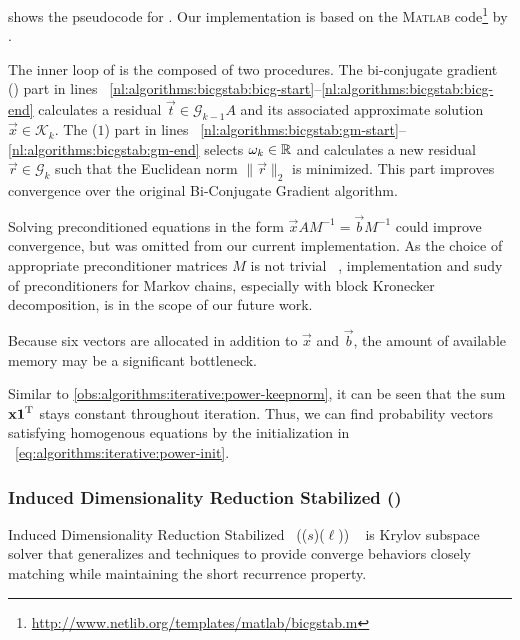  shows the pseudocode for
. Our implementation is based on the \textsc{Matlab}
code\footnote{\url{http://www.netlib.org/templates/matlab/bicgstab.m}}
by \citet{barrett1994templates}.

The inner loop of  is the composed of two
procedures. The bi-conjugate gradient () part in lines~%
\ref{nl:algorithms:bicgstab:bicg-start}--\ref{nl:algorithms:bicgstab:bicg-end}
calculates a residual $\vec{t} \in \mathcal{G}_{k - 1} A$ and its
associated approximate solution $\vec{x} \in \mathcal{K}_k$. The
($1$) part in lines~%
\ref{nl:algorithms:bicgstab:gm-start}--\ref{nl:algorithms:bicgstab:gm-end}
selects $\omega_k \in \mathbb{R}$ and calculates a new residual
$\vec{r} \in \mathcal{G}_{k}$ such that the Euclidean norm
$\| \vec{r} \|_2$ is minimized. This part improves convergence over
the original Bi-Conjugate Gradient algorithm.

Solving preconditioned equations in the form
$\vec{x} A M^{-1} = \vec{b} M^{-1}$ could improve convergence, but was
omitted from our current implementation. As the choice of appropriate
preconditioner matrices $M$ is not trivial%
~\citep{DBLP:journals/informs/LangvilleS04}, implementation and sudy
of preconditioners for Markov chains, especially with block Kronecker
decomposition, is in the scope of our future work.

Because six vectors are allocated in addition to $\vec{x}$ and
$\vec{b}$, the amount of available memory may be a significant
bottleneck.

Similar to \vref{obs:algorithms:iterative:power-keepnorm}, it can be
seen that the sum $\bm{\mathrm{x}} \bm{\mathrm{1}}^{\mathrm{T}}$ stays constant throughout
 iteration. Thus, we can find probability vectors
satisfying homogenous equations by the initialization in%
~\vref{eq:algorithms:iterative:power-init}.

\subsubsection{Induced Dimensionality Reduction Stabilized ()}
\label{ssec:algorithms:idrstab}

Induced Dimensionality Reduction Stabilized%
~(($s$)($\ell$))%
~\citep{sleijpen2010exploiting} is Krylov subspace solver that
generalizes  and  techniques to provide
converge behaviors closely matching  while maintaining
the short recurrence property.


